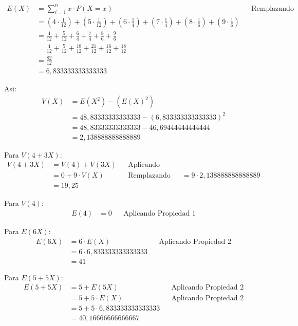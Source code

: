 \documentclass{templateNote}
\begin{document}
\begin{align*}
    E(X) &= \sum_{i=1}^{n}{x \cdot P(X=x)} && \text{Remplazando} \\
    &= (4 \cdot \frac{1}{12}) + (5 \cdot \frac{1}{12}) + (6 \cdot \frac{1}{4}) + (7 \cdot \frac{1}{4}) + (8 \cdot \frac{1}{6}) + (9 \cdot \frac{1}{6}) \\
    &= \frac{4}{12} + \frac{5}{12} + \frac{6}{4} + \frac{7}{4} + \frac{8}{6} + \frac{9}{6} \\
    &= \frac{4}{12} + \frac{5}{12} + \frac{18}{12} + \frac{21}{12} + \frac{16}{12} + \frac{18}{12} \\
    &= \frac{82}{12} \\
    &= 6,833333333333333
\end{align*}

Asi:
\begin{align*}
    V(X) &= E(X^2) - (E(X)^2) \\
    &= 48,83333333333333 - (6,833333333333333)^2 \\
    &= 48,83333333333333 - 46,69444444444444 \\
    &= 2,138888888888889
\end{align*}

Para $V(4+3X)$:
\begin{align*}
    V(4+3X) &= V(4) + V(3X)  && \text{Aplicando Propiedad 1 y 3} \\
    &= 0 + 9 \cdot V(X) && \text{Remplazando}
    &= 9 \cdot 2,138888888888889 \\
    &= 19,25
\end{align*}

Para $V(4)$:
\begin{align*}
    E(4) &= 0 && \text{Aplicando Propiedad 1}
\end{align*}

Para $E(6X)$:
\begin{align*}
    E(6X) &= 6 \cdot E(X) && \text{Aplicando Propiedad 2} \\
    &= 6 \cdot 6,833333333333333 \\
    &= 41
\end{align*}

Para $E(5+5X)$:
\begin{align*}
    E(5+5X) &= 5 + E(5X) && \text{Aplicando Propiedad 2} \\
    &= 5 + 5 \cdot E(X) && \text{Aplicando Propiedad 2} \\
    &= 5 + 5 \cdot 6,833333333333333 \\
    &= 40,16666666666667
\end{align*}
\end{document}
